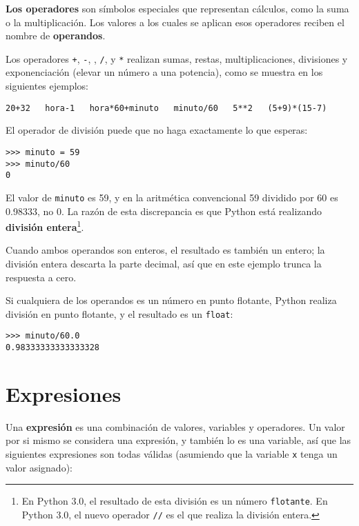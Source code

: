 {\bf Los operadores} son símbolos especiales que representan cálculos, como
la suma o la multiplicación. Los valores a los cuales se aplican esos operadores
reciben el nombre de {\bf operandos}.

Los operadores {\tt +}, {\tt -}, {\tt *}, {\tt /}, y {\tt **}
realizan sumas, restas, multiplicaciones, divisiones y
exponenciación (elevar un número a una potencia), como se muestra en los siguientes ejemplos:

\beforeverb
\begin{verbatim}
20+32   hora-1   hora*60+minuto   minuto/60   5**2   (5+9)*(15-7)
\end{verbatim}
\afterverb
%
El operador de división puede que no haga exactamente lo que esperas:

\beforeverb
\begin{verbatim}
>>> minuto = 59
>>> minuto/60
0
\end{verbatim}
\afterverb
%
El valor de {\tt minuto} es 59, y en la aritmética convencional 59
dividido por 60 es 0.98333, no 0. La razón de esta discrepancia es
que Python está realizando {\bf división entera}\footnote{En Python 3.0,
el resultado de esta división es un número {\tt flotante}.
En Python 3.0, el nuevo operador
{\tt //} es el que realiza la división entera.}.


Cuando ambos operandos son enteros, el resultado es también un
entero; la división entera descarta la parte decimal,
así que en este ejemplo trunca la respuesta a cero.

Si cualquiera de los operandos es un número en punto flotante, Python realiza
división en punto flotante, y el resultado es un {\tt float}:

\beforeverb
\begin{verbatim}
>>> minuto/60.0
0.98333333333333328
\end{verbatim}
\afterverb


\section{Expresiones}

Una {\bf expresión} es una combinación de valores, variables y operadores.
Un valor por si mismo se considera una expresión, y también lo es
una variable, así que las siguientes expresiones son todas válidas
(asumiendo que la variable {\tt x} tenga un valor asignado):

